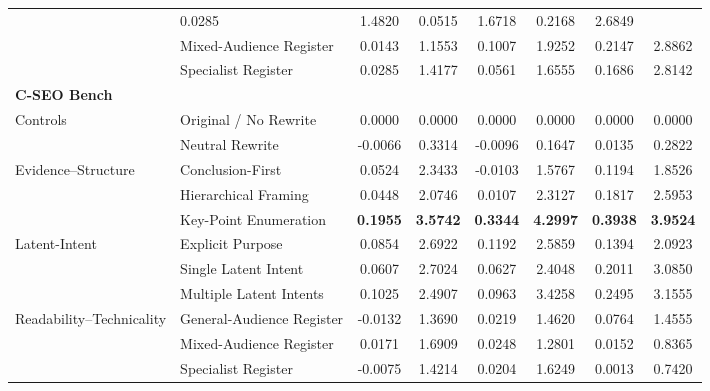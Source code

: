 \begin{table}[t]
{\begin{tabular}{llcccccc}
        & 0.0285 & 1.4820 & 0.0515 & 1.6718 & 0.2168 & 2.6849 \\
       & Mixed-Audience Register
        & 0.0143 & 1.1553 & 0.1007 & 1.9252 & 0.2147 & 2.8862 \\
       & Specialist Register
        & 0.0285 & 1.4177 & 0.0561 & 1.6555 & 0.1686 & 2.8142 \\
      \midrule
      \multicolumn{8}{l}{\textbf{C-SEO Bench}} \\
      \midrule
      Controls & Original / No Rewrite
        & 0.0000 & 0.0000 & 0.0000 & 0.0000 & 0.0000 & 0.0000 \\
       & Neutral Rewrite
        & -0.0066 & 0.3314 & -0.0096 & 0.1647 & 0.0135 & 0.2822 \\
      \midrule
      Evidence--Structure & Conclusion-First
        & 0.0524 & 2.3433 & -0.0103 & 1.5767 & 0.1194 & 1.8526 \\
       & Hierarchical Framing
        & 0.0448 & 2.0746 & 0.0107 & 2.3127 & 0.1817 & 2.5953 \\
       & Key-Point Enumeration
        & \textbf{0.1955} & \textbf{3.5742} & \textbf{0.3344} & \textbf{4.2997} & \textbf{0.3938} & \textbf{3.9524} \\
      \midrule
      Latent-Intent & Explicit Purpose
        & 0.0854 & 2.6922 & 0.1192 & 2.5859 & 0.1394 & 2.0923 \\
       & Single Latent Intent
        & 0.0607 & 2.7024 & 0.0627 & 2.4048 & 0.2011 & 3.0850 \\
       & Multiple Latent Intents
        & 0.1025 & 2.4907 & 0.0963 & 3.4258 & 0.2495 & 3.1555 \\
      \midrule
      Readability--Technicality & General-Audience Register
        & -0.0132 & 1.3690 & 0.0219 & 1.4620 & 0.0764 & 1.4555 \\
       & Mixed-Audience Register
        & 0.0171 & 1.6909 & 0.0248 & 1.2801 & 0.0152 & 0.8365 \\
       & Specialist Register
        & -0.0075 & 1.4214 & 0.0204 & 1.6249 & 0.0013 & 0.7420 \\
      \bottomrule
    \end{tabular}%
  }
\end{table}
